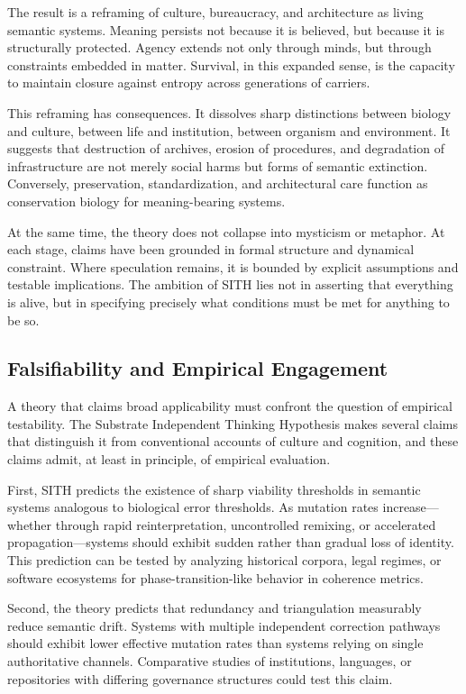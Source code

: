 \documentclass[11pt,oneside]{article}
\begin{document}
The result is a reframing of culture, bureaucracy, and architecture as living semantic systems. Meaning persists not because it is believed, but because it is structurally protected. Agency extends not only through minds, but through constraints embedded in matter. Survival, in this expanded sense, is the capacity to maintain closure against entropy across generations of carriers.

This reframing has consequences. It dissolves sharp distinctions between biology and culture, between life and institution, between organism and environment. It suggests that destruction of archives, erosion of procedures, and degradation of infrastructure are not merely social harms but forms of semantic extinction. Conversely, preservation, standardization, and architectural care function as conservation biology for meaning-bearing systems.

At the same time, the theory does not collapse into mysticism or metaphor. At each stage, claims have been grounded in formal structure and dynamical constraint. Where speculation remains, it is bounded by explicit assumptions and testable implications. The ambition of SITH lies not in asserting that everything is alive, but in specifying precisely what conditions must be met for anything to be so.

\subsection{Falsifiability and Empirical Engagement}

A theory that claims broad applicability must confront the question of empirical testability. The Substrate Independent Thinking Hypothesis makes several claims that distinguish it from conventional accounts of culture and cognition, and these claims admit, at least in principle, of empirical evaluation.

First, SITH predicts the existence of sharp viability thresholds in semantic systems analogous to biological error thresholds. As mutation rates increase—whether through rapid reinterpretation, uncontrolled remixing, or accelerated propagation—systems should exhibit sudden rather than gradual loss of identity. This prediction can be tested by analyzing historical corpora, legal regimes, or software ecosystems for phase-transition-like behavior in coherence metrics.

Second, the theory predicts that redundancy and triangulation measurably reduce semantic drift. Systems with multiple independent correction pathways should exhibit lower effective mutation rates than systems relying on single authoritative channels. Comparative studies of institutions, languages, or repositories with differing governance structures could test this claim.
\end{document}
